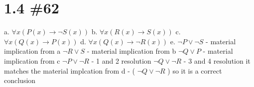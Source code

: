 \documentclass[h]{article}
\begin{document}
\section*{1.4 \#62}
a. $\forall x ( P(x) \rightarrow \neg S(x))$\newline
b. $\forall x ( R(x) \rightarrow S(x))$ \newline
c. $\forall x ( Q(x) \rightarrow P(x))$ \newline
d. $\forall x ( Q(x) \rightarrow \neg R(x))$ \newline
e.
\newline
$\neg P \vee \neg S$ - material implication from a \newline
$\neg R \vee S$ - material implication from b \newline
$\neg Q \vee P$ - material implication from c \newline
$\neg P \vee \neg R$ - 1 and 2 resolution\newline
$\neg Q \vee \neg R$ - 3 and 4 resolution
\newline \newline
it matches the material implcation from d - ( $\neg Q \vee \neg R$ )
so it is a correct conclusion
\end{document}
